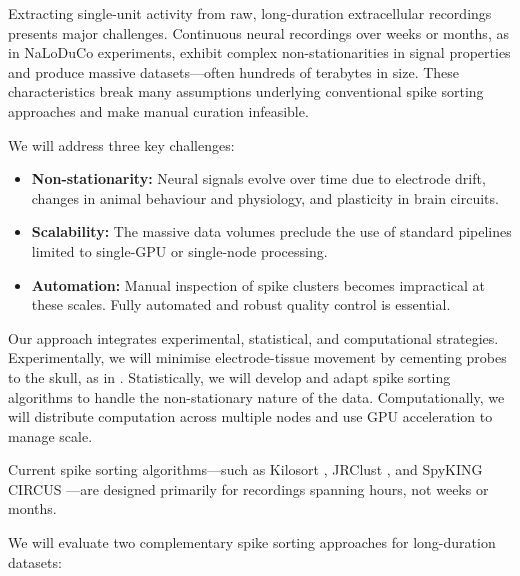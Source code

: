 Extracting single-unit activity from raw, long-duration extracellular
recordings presents major challenges. Continuous neural recordings over weeks
or months, as in NaLoDuCo experiments, exhibit complex non-stationarities in
signal properties and produce massive datasets—often hundreds of terabytes in
size. These characteristics break many assumptions underlying conventional
spike sorting approaches and make manual curation infeasible.

We will address three key challenges:

\begin{itemize}
    \item \textbf{Non-stationarity:} Neural signals evolve over time due to electrode drift, changes in animal behaviour and physiology, and plasticity in brain circuits.
    \item \textbf{Scalability:} The massive data volumes preclude the use of standard pipelines limited to single-GPU or single-node processing.
    \item \textbf{Automation:} Manual inspection of spike clusters becomes impractical at these scales. Fully automated and robust quality control is essential.
\end{itemize}

Our approach integrates experimental, statistical, and computational strategies. Experimentally, we will minimise electrode-tissue movement by cementing probes to the skull, as in \citet{schoonoverEtAl21}. Statistically, we will develop and adapt spike sorting algorithms to handle the non-stationary nature of the data. Computationally, we will distribute computation across multiple nodes and use GPU acceleration to manage scale.

\label{sec:offlineMethodsNonStationarity}

Current spike sorting algorithms—such as Kilosort \citep{pachitariuEtAl24}, JRClust \citep{chungEtAl17}, and SpyKING CIRCUS \citep{ygerEtAl18}—are designed primarily for recordings spanning hours, not weeks or months.

We will evaluate two complementary spike sorting approaches for long-duration datasets:

